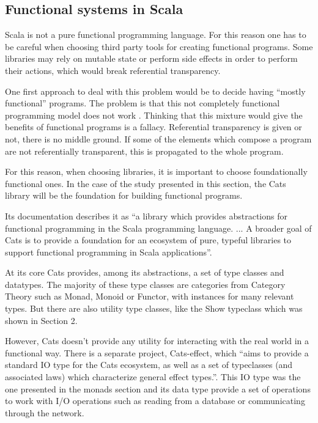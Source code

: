 \documentclass[../main.tex]{subfiles}
\begin{document}
\subsection{Functional systems in Scala}
Scala is not a pure functional programming language. For this reason one has to
be careful when choosing third party tools for creating functional programs.
Some libraries may rely on mutable state or perform side effects in order to
perform their actions, which would break referential transparency.

One first approach to deal with this problem would be to decide having ``mostly
functional'' programs. The problem is that this not completely functional
programming model does not work \autocite{MeijerTheWork}. Thinking that
this mixture would give the benefits of functional programs is a
fallacy. Referential transparency is given or not, there is no middle ground. If
some of the elements which compose a program are not referentially transparent,
this is propagated to the whole program.

For this reason, when choosing libraries, it is important to choose foundationally
functional ones. In the case of the study presented in this section, the Cats library
\autocite{Cats:Home} will be the foundation for building functional programs.

Its documentation describes it as ``a library which provides abstractions for
functional programming in the Scala programming language. ... A broader goal of
Cats is to provide a foundation for an ecosystem of pure, typeful libraries to
support functional programming in Scala applications''.

At its core Cats provides, among its abstractions, a set of type classes and
datatypes. The majority of these type classes are categories from Category Theory
such as Monad, Monoid or Functor, with instances for many relevant types. But
there are also utility type classes, like the Show typeclass which was shown in
Section 2.

However, Cats doesn't provide any utility for interacting with the real world in
a functional way. There is a separate project, Cats-effect, 
which ``aims to
provide a standard IO type for the Cats ecosystem, as well as a set
of typeclasses (and associated laws) which characterize general effect types.''.
This IO type was the one presented in the monads section and its data type
provide a set of operations to work with I/O operations such as reading from a
database or communicating through the network.
\end{document}
